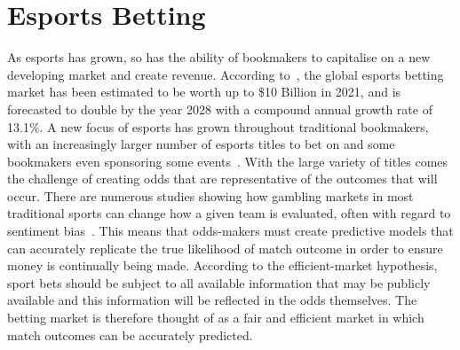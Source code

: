 \section{Esports Betting}\label{sec:Esports Betting}
As esports has grown, so has the ability of bookmakers to capitalise on a new developing market and create revenue.
According to~\citet{absolute2022esportsbet}, the global esports betting market has been estimated to be worth up to \$10 Billion in 2021, and is forecasted to double by the year 2028 with a compound annual growth rate of 13.1\%.
A new focus of esports has grown throughout traditional bookmakers, with an increasingly larger number of esports titles to bet on and some bookmakers even sponsoring some events~\citep{esportsinsider2019}.
With the large variety of titles comes the challenge of creating odds that are representative of the outcomes that will occur.
There are numerous studies showing how gambling markets in most traditional sports can change how a given team is evaluated, often with regard to sentiment bias~\citep{feddersen2018sentiment, na2019not}.
This means that odds-makers must create predictive models that can accurately replicate the true likelihood of match outcome in order to ensure money is continually being made.
According to the efficient-market hypothesis, sport bets should be subject to all available information that may be publicly available and this information will be reflected in the odds themselves\citep{even1992testing}.
The betting market is therefore thought of as a fair and efficient market in which match outcomes can be accurately predicted.\\

